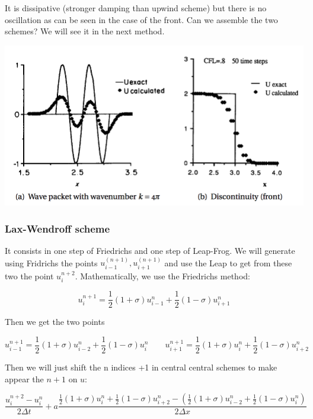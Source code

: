 It is dissipative (stronger damping than upwind scheme) but there is no oscillation as can be seen in the case of the front. Can we assemble the two schemes? We will see it in the next method.

\begin{center}
\includegraphics[scale=0.5]{ch3/12}
\end{center}

\subsubsection{Lax-Wendroff scheme}
It consists in one step of Friedrichs and one step of Leap-Frog. We will generate using Fridrichs the points $u^(n+1)_{i-1}, u^(n+1)_{i+1}$  and use the Leap to get from these two the point $u_{i}^{n+2}$. Mathematically, we use the Friedrichs method: 

\begin{equation}
u_i^{n+1} = \frac{1}{2}(1+\sigma )u_{i-1}^n + \frac{1}{2}(1-\sigma) u_{i+1}^n
\end{equation}

Then we get the two points 

\begin{equation}
u_{i-1}^{n+1} = \frac{1}{2}(1+\sigma )u_{i-2}^n + \frac{1}{2}(1-\sigma) u_{i}^n\qquad 
u_{i+1}^{n+1} = \frac{1}{2}(1+\sigma )u_{i}^n + \frac{1}{2}(1-\sigma) u_{i+2}^n
\end{equation}

Then we will just shift the n indices +1 in central central schemes to make appear the $n+1$ on $u$: 

\begin{equation}
\frac{u_i^{n+2} - u_i^n}{2\Delta t} + a \frac{\frac{1}{2}(1+\sigma)u_i^{n} + \frac{1}{2}(1-\sigma)u_{i+2}^n-\left(\frac{1}{2}(1+\sigma)u_{i-2}^n + \frac{1}{2}(1-\sigma)u_i^n \right)}{2\Delta x}
\end{equation}

